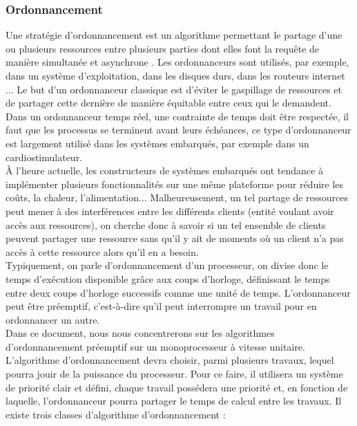 \documentclass[12pt,a4paper,oneside]{book}
\theoremstyle{break}
\theoremstyle{breakplain}
\begin{document}
\subsubsection{Ordonnancement}
Une stratégie d'ordonnancement est un algorithme permettant le partage d'une ou plusieurs ressources entre plusieurs parties dont elles font la requête de manière simultanée et asynchrone \cite{goossens2014os}. Les ordonnanceurs sont utilisés, par exemple, dans un système d'exploitation, dans les disques durs, dans les routeurs internet ... Le but d'un ordonnanceur classique est d'éviter le gaspillage de ressources et de partager cette dernière de manière équitable entre ceux qui le demandent. Dans un ordonnanceur temps réel, une contrainte de temps doit être respectée, il faut que les processus se terminent avant leurs échéances, ce type d'ordonnanceur est largement utilisé dans les systèmes embarqués, par exemple dans un cardiostimulateur.\\

À l'heure actuelle, les constructeurs de systèmes embarqués ont tendance à implémenter plusieurs fonctionnalités sur une même plateforme pour réduire les coûts, la chaleur, l'alimentation... Malheureusement, un tel partage de ressources peut mener à des interférences entre les différents clients (entité voulant avoir accès aux ressources), on cherche donc à savoir si un tel ensemble de clients peuvent partager une ressource sans qu'il y ait de moments où un client n'a pas accès à cette ressource alors qu'il en a besoin.\\

Typiquement, on parle d'ordonnancement d'un processeur, on divise donc le temps d'exécution disponible grâce aux coups d'horloge, définissant le temps entre deux coups d'horloge successifs comme une unité de temps. L'ordonnanceur peut être préemptif, c'est-à-dire qu'il peut interrompre un travail pour en ordonnancer un autre.\\

Dans ce document, nous nous concentrerons sur les algorithmes d'ordonnancement préemptif sur un monoprocesseur à vitesse unitaire.\\

L'algorithme d'ordonnancement devra choisir, parmi plusieurs travaux, lequel pourra jouir de la puissance du processeur.  Pour ce faire, il utilisera un système de priorité clair et défini, chaque travail possédera une priorité et, en fonction de laquelle, l'ordonnanceur pourra partager le temps de calcul entre les travaux. Il existe trois classes d'algorithme d'ordonnancement \cite{goossens2014os} :\\
\end{document}
